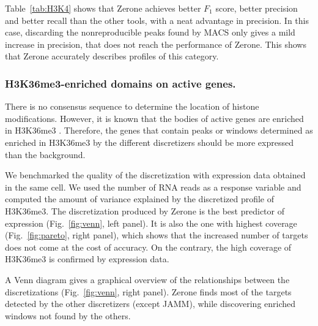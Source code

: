 \documentclass{bioinfo}
\begin{document}
Table~\ref{tab:H3K4} shows that Zerone achieves better $F_1$ score,
better precision and better recall than the other tools, with
a neat advantage in precision. In this case, discarding the
nonreproducible peaks found by MACS only gives a mild increase in
precision, that does not reach the performance of Zerone.
This shows that Zerone accurately describes profiles of this category.

\subsubsection{H3K36me3-enriched domains on active genes.}
\label{subsub:h3k36me3}
There is no consensus sequence to determine the location of histone
modifications. However, it is known that the bodies of active genes
are enriched in H3K36me3 \citep{pmid16122420,pmid23739122}. Therefore,
the genes that contain peaks or windows determined as enriched in
H3K36me3 by the different discretizers should be more expressed than
the background.

We benchmarked the quality of the discretization with expression
data obtained in the same cell. We used the number of RNA reads
as a response variable and computed the amount of variance
explained by the discretized profile of H3K36me3. The discretization
produced by Zerone is the best predictor of expression
(Fig.~\ref{fig:venn}, left panel). It is also the one with highest coverage
(Fig.~\ref{fig:pareto}, right panel), which shows that the increased number of
targets does not come at the cost of accuracy. On the contrary,
the high coverage of H3K36me3 is confirmed by expression data.

A Venn diagram gives a graphical overview of the relationships
between the discretizations (Fig.~\ref{fig:venn}, right panel). Zerone finds
most of the targets detected by the other discretizers (except JAMM),
while discovering enriched windows not found by the others.
\end{document}
